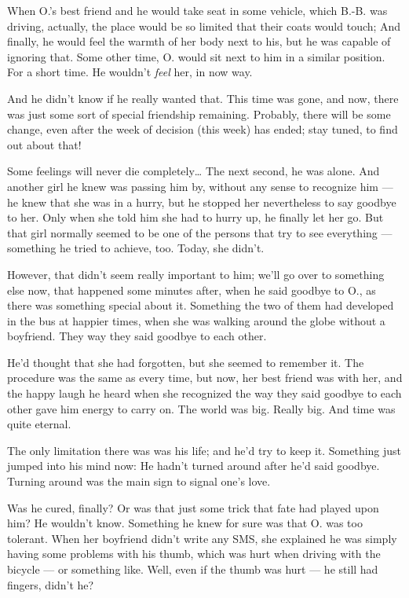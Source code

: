 When O.'s best friend and he would take seat in some vehicle, which B.-B. was driving, actually, the place would be so limited that their coats would touch; And finally, he would feel the warmth of her body next to his, but he was capable of ignoring that. 
Some other time, O. would sit next to him in a similar position.
For a short time.
He wouldn't \emph{feel} her, in now way.

And he didn't know if he really wanted that. 
This time was gone, and now, there was just some sort of special friendship remaining. 
Probably, there will be some change, even after the week of decision (this week) has ended; stay tuned, to find out about that!

Some feelings will never die completely\ldots
The next second, he was alone. 
And another girl he knew was passing him by, without any sense to recognize him --- he knew that she was in a hurry, but he stopped her nevertheless to say goodbye to her. 
Only when she told him she had to hurry up, he finally let her go. 
But that girl normally seemed to be one of the persons that try to see everything --- something he tried to achieve, too. 
Today, she didn't.

However, that didn't seem really important to him; we'll go over to something else now, that happened some minutes after, when he said goodbye to O., as there was something special about it. 
Something the two of them had developed in the bus at happier times, when she was walking around the globe without a boyfriend. 
They way they said goodbye to each other.

He'd thought that she had forgotten, but she seemed to remember it. 
The procedure was the same as every time, but now, her best friend was with her, and the happy laugh he heard when she recognized the way they said goodbye to each other gave him energy to carry on. 
The world was big. 
Really big. 
And time was quite eternal.

The only limitation there was was his life; and he'd try to keep it. 
Something just jumped into his mind now: He hadn't turned around after he'd said goodbye.
Turning around was the main sign to signal one's love. 

Was he cured, finally?
Or was that just some trick that fate had played upon him?
He wouldn't know. 
Something he knew for sure was that O. was too tolerant. 
When her boyfriend didn't write any SMS, she explained he was simply having some problems with his thumb, which was hurt when driving with the bicycle --- or something like. 
Well, even if the thumb was hurt --- he still had fingers, didn't he?

